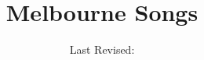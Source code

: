 \documentclass[12pt]{book}
\title{Melbourne Songs}
\date{Last Revised:  \RevDate}
\newcommand{\RevDate}{\today}
\newcommand{\NotCCLIed}{\relax}
\begin{document}
\maketitle

\newpage
\hypertarget{songindex}{}
\begin{theindex}
  
\end{theindex}

\mainmatter
\ifWordBk
\twocolumn
\fi












\end{document}

